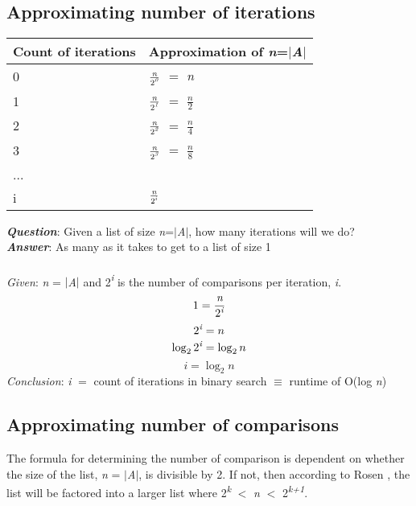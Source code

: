 \documentclass[11pt]{article}
\theoremstyle{plain}
\theoremstyle{definition}
\begin{document}
\subsection*{Approximating number of iterations}
\begin{center}
\normalsize
\begin{tabular}{ p{5cm}p{5cm}  }
\hline
Count of iterations & Approximation of \textit{n}=$|$\textit{A}$|$\\
\hline
0 & $ \frac{\textit{n}}{2\textit{\textsuperscript{0}}} $ $=$ \textit{n}\\
1 & $ \frac{\textit{n}}{2\textit{\textsuperscript{1}}} $ $=$ $ \frac{\textit{n}}{2}$ \\
2 & $ \frac{\textit{n}}{2\textit{\textsuperscript{2}}} $ $=$ $ \frac{\textit{n}}{4}$ \\
3 & $ \frac{\textit{n}}{2\textit{\textsuperscript{3}}} $ $=$ $ \frac{\textit{n}}{8}$ \\
... \\
i & $ \frac{\textit{n}}{2\textit{\textsuperscript{i}}} $ \\
\hline
\end{tabular}
\end{center}

\setlength{\parindent}{0pt}\textbf{\textit{Question}}: Given a list of size \textit{n}=$|$\textit{A}$|$, how many iterations will we do?\\
\textbf{\textit{Answer}}: As many as it takes to get to a list of size 1\\\\
\textit{Given}: \textit{n} = $|$\textit{A}$|$ and 2\textit{\textsuperscript{i}} is the number of comparisons per iteration, \textit{i}.\\
\begin{equation}1 = \frac{\textit{n}}{2\textit{\textsuperscript{i}}} \end{equation}
\begin{equation}2\textit{\textsuperscript{i}} = n\end{equation}
\begin{equation}\log_2 2\textit{\textsuperscript{i}} = \log_2 n\end{equation}
\begin{equation}\textit{i} = \log_2 n\end{equation}
\textit{Conclusion}: \textit{i} $=$ count of iterations in binary search $\equiv$ runtime of O(log \textit{n})
\subsection*{Approximating number of comparisons}
The formula for determining the number of comparison is dependent on whether the size of the list, \textit{n} = $|$\textit{A}$|$, is divisible by 2. If not, then according to Rosen \cite{rosen:1}, the list will be factored into a larger list where 2\textit{\textsuperscript{k}} $<$ \textit{n} $<$ 2\textit{\textsuperscript{k+1}}.\\
\end{document}
